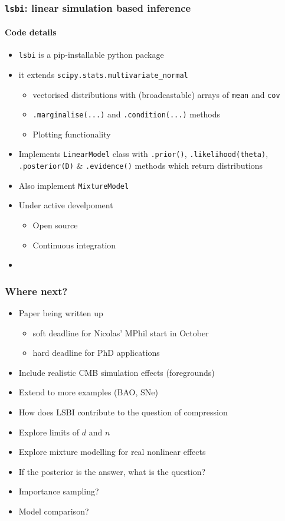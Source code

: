 \documentclass[aspectratio=169]{beamer}
\begin{document}
\begin{frame}
    \frametitle{\texttt{lsbi}: linear simulation based inference}
    \framesubtitle{Code details}
    \begin{itemize}
        \item \texttt{lsbi} is a pip-installable python package
        \item it extends \texttt{scipy.stats.multivariate\_normal}
            \begin{itemize}
                \item vectorised distributions with (broadcastable) arrays of \texttt{mean} and \texttt{cov}
                \item \texttt{.marginalise(...)} and \texttt{.condition(...)} methods
                \item Plotting functionality
            \end{itemize}
        \item Implements \texttt{LinearModel} class with \texttt{.prior()}, \texttt{.likelihood(theta)}, \texttt{.posterior(D)} \& \texttt{.evidence()} methods which return distributions
        \item Also implement \texttt{MixtureModel}
        \item Under active develpoment
            \begin{itemize}
                \item Open source
                \item Continuous integration
            \end{itemize}
        \item {}
    \end{itemize}
\end{frame}

\begin{frame}
    \frametitle{Where next?}
    \begin{itemize}
        \item Paper being written up 
            \begin{itemize}
                \item soft deadline for Nicolas' MPhil start in October
                \item hard deadline for PhD applications
            \end{itemize}
        \item Include realistic CMB simulation effects (foregrounds)
        \item Extend to more examples (BAO, SNe)
        \item How does LSBI contribute to the question of compression
        \item Explore limits of $d$ and $n$
        \item Explore mixture modelling for real nonlinear effects
        \item If the posterior is the answer, what is the question?
        \item Importance sampling?
        \item Model comparison?
    \end{itemize}
\end{frame}
\end{document}
